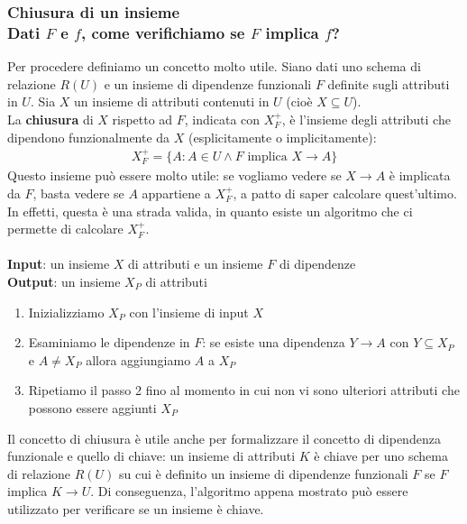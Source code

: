 \subsubsection{Chiusura di un insieme\\
Dati $F$ e $f$, come verifichiamo se $F$ implica $f$?}
Per procedere definiamo un concetto molto utile. Siano dati uno schema di relazione $R(U)$ e un insieme di dipendenze funzionali $F$ definite sugli attributi in $U$. 
Sia $X$ un insieme di attributi contenuti in $U$ (cioè $X \subseteq U$).\\
La \textbf{chiusura} di $X$ rispetto ad $F$, indicata con $X_F^+$, è l'insieme degli attributi che dipendono funzionalmente da $X$ (esplicitamente o implicitamente):
    \begin{equation}\begin{aligned}
        X_F^+ = \{ A: A \in U \wedge F \text{ implica } X \rightarrow A \}
    \end{aligned}\end{equation}
Questo insieme può essere molto utile: se vogliamo vedere se $X \rightarrow A$ è implicata da $F$, basta vedere se $A$ appartiene a $X_F^+$, a patto di saper calcolare quest'ultimo.\\
In effetti, questa è una strada valida, in quanto esiste un algoritmo che ci permette di calcolare $X_F^+$.\\\\
\textbf{Input}: un insieme $X$ di attributi e un insieme $F$ di dipendenze\\
\textbf{Output}: un insieme $X_P$ di attributi
    \begin{enumerate}
        \item{Inizializziamo $X_P$ con l'insieme di input $X$}
        \item{Esaminiamo le dipendenze in $F$: se esiste una dipendenza $Y \rightarrow A$ con $Y \subseteq X_P$ e $A \neq X_P$ allora aggiungiamo $A$ a $X_P$}
        \item{Ripetiamo il passo 2 fino al momento in cui non vi sono ulteriori attributi che possono essere aggiunti $X_P$}
    \end{enumerate}
Il concetto di chiusura è utile anche per formalizzare il concetto di dipendenza funzionale e quello di chiave: un insieme di attributi $K$ è chiave per uno schema di relazione $R(U)$ su cui è definito un insieme di dipendenze funzionali $F$ se $F$ implica $K \rightarrow U$. Di conseguenza, l'algoritmo appena mostrato può essere utilizzato per verificare se un insieme è chiave.
